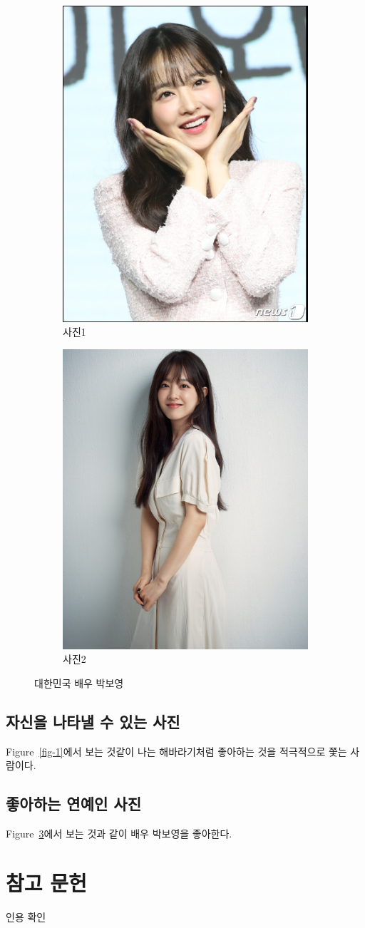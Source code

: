 \documentclass{article}
\begin{document}
\begin{figure}[!htb]
    \centering
    \begin{subfigure}[!htb]{0.4\textwidth}
        \centering
        \includegraphics[width=0.5\linewidth]{image2.png}
        \caption{사진1}
        \label{fig:fig-2-a}
    \end{subfigure}
    \hfill
    \begin{subfigure}[!htb]{0.4\textwidth}
        \centering
        \includegraphics[width=0.5\linewidth]{image.png}
        \caption{사진2}
        \label{fig:fig-2-b}
    \end{subfigure}
    \caption{대한민국 배우 박보영}
    \label{fig:fig-2}
\end{figure}
    \subsection{자신을 나타낼 수 있는 사진}
    Figure~\ref{fig-1}에서 보는 것같이 나는 해바라기처럼 좋아하는 것을 적극적으로 쫓는 사람이다.
    \subsection{좋아하는 연예인 사진}
    Figure~\ref{fig:fig-2}에서 보는 것과 같이 배우 박보영을 좋아한다.

\section{참고 문헌}
인용 확인~\cite{floridi2020gpt}


\end{document}

